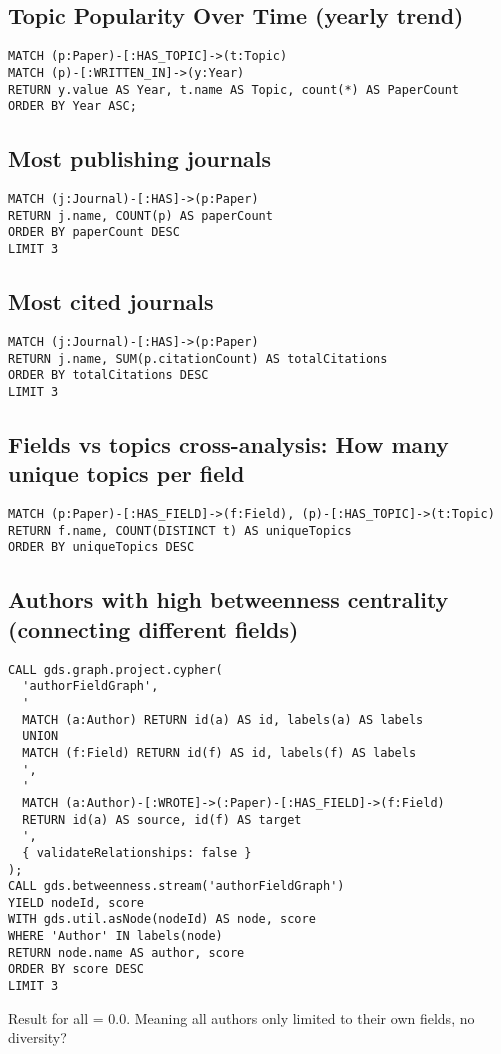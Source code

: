 \documentclass{article}
\theoremstyle{mytheoremstyle}
\theoremstyle{mytheoremstyle}
\theoremstyle{myproblemstyle}
\begin{document}
\subsection{Topic Popularity Over Time (yearly trend)}
\begin{lstlisting}[style=cypherstyle]
MATCH (p:Paper)-[:HAS_TOPIC]->(t:Topic) 
MATCH (p)-[:WRITTEN_IN]->(y:Year) 
RETURN y.value AS Year, t.name AS Topic, count(*) AS PaperCount 
ORDER BY Year ASC;  
\end{lstlisting}

\subsection{Most publishing journals}
\begin{lstlisting}[style=cypherstyle]
MATCH (j:Journal)-[:HAS]->(p:Paper) 
RETURN j.name, COUNT(p) AS paperCount 
ORDER BY paperCount DESC 
LIMIT 3   
\end{lstlisting}

\subsection{Most cited journals}
\begin{lstlisting}[style=cypherstyle]
MATCH (j:Journal)-[:HAS]->(p:Paper) 
RETURN j.name, SUM(p.citationCount) AS totalCitations 
ORDER BY totalCitations DESC 
LIMIT 3   
\end{lstlisting}

\subsection{Fields vs topics cross-analysis: How many unique topics per field}
\begin{lstlisting}[style=cypherstyle]
MATCH (p:Paper)-[:HAS_FIELD]->(f:Field), (p)-[:HAS_TOPIC]->(t:Topic) 
RETURN f.name, COUNT(DISTINCT t) AS uniqueTopics 
ORDER BY uniqueTopics DESC  
\end{lstlisting}

\subsection{Authors with high betweenness centrality (connecting different fields)}
\begin{lstlisting}[style=cypherstyle]
CALL gds.graph.project.cypher( 
  'authorFieldGraph', 
  ' 
  MATCH (a:Author) RETURN id(a) AS id, labels(a) AS labels 
  UNION 
  MATCH (f:Field) RETURN id(f) AS id, labels(f) AS labels 
  ', 
  ' 
  MATCH (a:Author)-[:WROTE]->(:Paper)-[:HAS_FIELD]->(f:Field) 
  RETURN id(a) AS source, id(f) AS target 
  ', 
  { validateRelationships: false } 
); 
CALL gds.betweenness.stream('authorFieldGraph') 
YIELD nodeId, score 
WITH gds.util.asNode(nodeId) AS node, score 
WHERE 'Author' IN labels(node) 
RETURN node.name AS author, score 
ORDER BY score DESC 
LIMIT 3  
\end{lstlisting}
Result for all = 0.0. Meaning all authors only limited to their own fields, no diversity?
\end{document}
